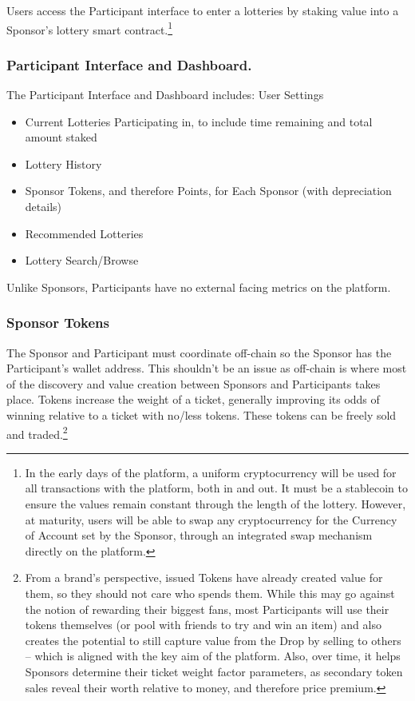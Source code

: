 \documentclass[runningheads]{llncs}
\begin{document}
Users access the Participant interface to enter a lotteries by staking value into a Sponsor’s lottery smart contract.\footnote{In the early days of the platform, a uniform cryptocurrency will be used for all transactions with the platform, both in and out.  It must be a stablecoin to ensure the values remain constant through the length of the lottery. However, at maturity, users will be able to swap any cryptocurrency for the Currency of Account set by the Sponsor, through an integrated swap mechanism directly on the platform.}

\subsubsection{Participant Interface and Dashboard.}  The Participant Interface and Dashboard includes:
User Settings
\begin{itemize}
\item Current Lotteries Participating in, to include time remaining and total amount staked
\item Lottery History 
\item Sponsor Tokens, and therefore Points, for Each Sponsor (with depreciation details)
\item Recommended Lotteries
\item Lottery Search/Browse
\end{itemize}
Unlike Sponsors, Participants have no external facing metrics on the platform.

\subsubsection{Sponsor Tokens}  The Sponsor and Participant must coordinate off-chain so the Sponsor has the Participant’s wallet address.  This shouldn’t be an issue as off-chain is where most of the discovery and value creation between Sponsors and Participants takes place.  Tokens increase the weight of a ticket, generally improving its odds of winning relative to a ticket with no/less tokens.  These tokens can be freely sold and traded.\footnote{From a brand’s perspective, issued Tokens have already created value for them, so they should not care who spends them.  While this may go against the notion of rewarding their biggest fans, most Participants will use their tokens themselves (or pool with friends to try and win an item) and also creates the potential to still capture value from the Drop by selling to others – which is aligned with the key aim of the platform.  Also, over time, it helps Sponsors determine their ticket weight factor parameters, as secondary token sales reveal their worth relative to money, and therefore price premium.}
\end{document}
